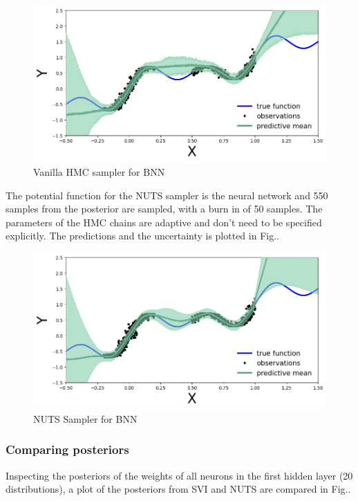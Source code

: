 \documentclass[11pt,a4paper]{article}
\begin{document}
\begin{figure}[h!]
    \centering
    \includegraphics[scale=0.5]{vanilla hmc.png}
    \caption{Vanilla HMC sampler for BNN}
    \label{fig:vanilla hmc}
\end{figure}
The potential function for the NUTS sampler is the neural network and 550 samples from the posterior are sampled, with a burn in of 50 samples. The parameters of the HMC chains are adaptive and don't need to be specified explicitly. The predictions and the uncertainty is plotted in Fig.\fbox{\ref{fig:nuts}}.
\begin{figure}[h!]
    \centering
    \includegraphics[scale=0.5]{nuts.png}
    \caption{NUTS Sampler for BNN}
    \label{fig:nuts}
\end{figure}

\subsubsection{Comparing posteriors}
Inspecting the posteriors of the weights of all neurons in the first hidden layer (20 distributions), a plot of the posteriors from SVI and NUTS are compared in Fig.\fbox{\ref{fig:posteriors}}.
\end{document}
